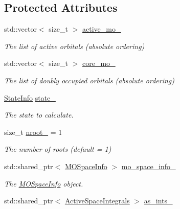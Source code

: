 \subsection*{Protected Attributes}
\begin{DoxyCompactItemize}
\item 
std\+::vector$<$ size\+\_\+t $>$ \mbox{\hyperlink{classforte_1_1_active_space_method_a02a2f9b7c138d1471cd6632650508819}{active\+\_\+mo\+\_\+}}
\begin{DoxyCompactList}\small\item\em The list of active orbitals (absolute ordering) \end{DoxyCompactList}\item 
std\+::vector$<$ size\+\_\+t $>$ \mbox{\hyperlink{classforte_1_1_active_space_method_aa68eb7267f635f0f885d921a61197281}{core\+\_\+mo\+\_\+}}
\begin{DoxyCompactList}\small\item\em The list of doubly occupied orbitals (absolute ordering) \end{DoxyCompactList}\item 
\mbox{\hyperlink{classforte_1_1_state_info}{State\+Info}} \mbox{\hyperlink{classforte_1_1_active_space_method_a1d90017e267642942760830b17d27d9f}{state\+\_\+}}
\begin{DoxyCompactList}\small\item\em The state to calculate. \end{DoxyCompactList}\item 
size\+\_\+t \mbox{\hyperlink{classforte_1_1_active_space_method_a3e299283cd1a99a718307a05f0790039}{nroot\+\_\+}} = 1
\begin{DoxyCompactList}\small\item\em The number of roots (default = 1) \end{DoxyCompactList}\item 
std\+::shared\+\_\+ptr$<$ \mbox{\hyperlink{classforte_1_1_m_o_space_info}{M\+O\+Space\+Info}} $>$ \mbox{\hyperlink{classforte_1_1_active_space_method_a7359678b3a1f747c0800323748bd9ba2}{mo\+\_\+space\+\_\+info\+\_\+}}
\begin{DoxyCompactList}\small\item\em The \mbox{\hyperlink{classforte_1_1_m_o_space_info}{M\+O\+Space\+Info}} object. \end{DoxyCompactList}\item 
std\+::shared\+\_\+ptr$<$ \mbox{\hyperlink{classforte_1_1_active_space_integrals}{Active\+Space\+Integrals}} $>$ \mbox{\hyperlink{classforte_1_1_active_space_method_ab012eecdedfe5373e2845fd6959e9fca}{as\+\_\+ints\+\_\+}}

\end{DoxyCompactItemize}
